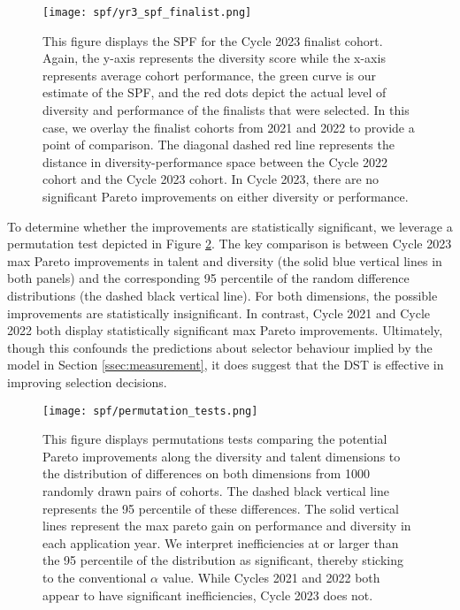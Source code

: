 \begin{figure}[!htb]
    \centering
    \caption{This figure displays the SPF for the Cycle 2023 finalist cohort. Again, the y-axis represents the diversity score while the x-axis represents average cohort performance, the green curve is our estimate of the SPF, and the red dots depict the actual level of diversity and performance of the finalists that were selected. In this case, we overlay the finalist cohorts from 2021 and 2022 to provide a point of comparison. The diagonal dashed red line represents the distance in diversity-performance space between the Cycle 2022 cohort and the Cycle 2023 cohort. In Cycle 2023, there are no significant Pareto improvements on either diversity or performance.} 
    \label{fig:spf_2023}
    \texttt{[image: spf/yr3\_spf\_finalist.png]}
\end{figure}

To determine whether the improvements are statistically significant, we leverage a permutation test depicted in Figure \ref{fig:permutation_tests}. The key comparison is between Cycle 2023 max Pareto improvements in talent and diversity (the solid blue vertical lines in both panels) and the corresponding 95 percentile of the random difference distributions (the dashed black vertical line). For both dimensions, the possible improvements are statistically insignificant. In contrast, Cycle 2021 and Cycle 2022 both display statistically significant max Pareto improvements. Ultimately, though this confounds the predictions about selector behaviour implied by the model in Section \ref{ssec:measurement}, it does suggest that the DST is effective in improving selection decisions.

\begin{figure}[htbp]
    \centering
    \caption{This figure displays permutations tests comparing the potential Pareto improvements along the diversity and talent dimensions to the distribution of differences on both dimensions from 1000 randomly drawn pairs of cohorts. The dashed black vertical line represents the 95 percentile of these differences. The solid vertical lines represent the max pareto gain on performance and diversity in each application year. We interpret inefficiencies at or larger than the 95 percentile of the distribution as significant, thereby sticking to the conventional $\alpha$ value. While Cycles 2021 and 2022 both appear to have significant inefficiencies, Cycle 2023 does not.}
    \label{fig:permutation_tests}
    \texttt{[image: spf/permutation\_tests.png]} 
\end{figure}

